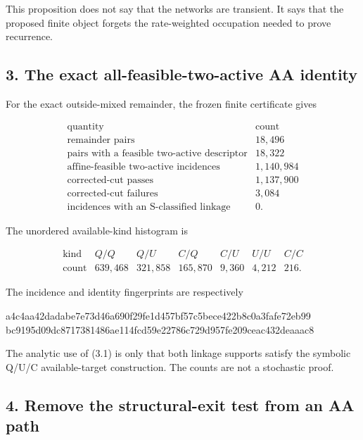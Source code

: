 This proposition does not say that the networks are transient. It says
that the proposed finite object forgets the rate-weighted occupation
needed to prove recurrence.

\subsection{3. The exact all-feasible-two-active AA
identity}

For the exact outside-mixed remainder, the frozen finite certificate
gives

\[
\begin{array}{c|r}
\text{quantity}&\text{count}\\ \hline
\text{remainder pairs}&18{,}496\\
\text{pairs with a feasible two-active descriptor}&18{,}322\\
\text{affine-feasible two-active incidences}&1{,}140{,}984\\
\text{corrected-cut passes}&1{,}137{,}900\\
\text{corrected-cut failures}&3{,}084\\
\text{incidences with an S-classified linkage}&0.
\end{array}                                                     \tag{3.1}
\]

The unordered available-kind histogram is

\[
\begin{array}{c|rrrrrr}
\text{kind}&Q/Q&Q/U&C/Q&C/U&U/U&C/C\\ \hline
\text{count}&639{,}468&321{,}858&165{,}870&9{,}360&4{,}212&216.
\end{array}                                                     \tag{3.2}
\]

The incidence and identity fingerprints are respectively

\begin{CodeBlock}
a4c4aa42dadabe7e73d46a690f29fe1d457bf57c5bece422b8c0a3fafe72eb99
bc9195d09dc8717381486ae114fcd59e22786c729d957fe209ceac432deaaac8
\end{CodeBlock}

The analytic use of (3.1) is only that both linkage supports satisfy the
symbolic Q/U/C available-target construction. The counts are not a
stochastic proof.

\subsection{4. Remove the structural-exit test from an AA
path}

